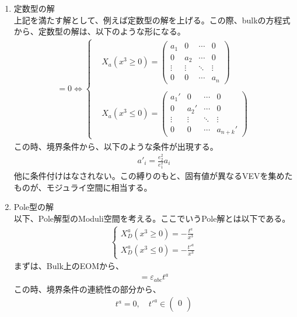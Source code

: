 \documentclass[dvipdfmx,a4paper,10.5pt]{article}
\numberwithin{equation}{section}
\begin{document}
\begin{enumerate}
    \item 定数型の解\\
    上記を満たす解として、例えば定数型の解を上げる。この際、bulkの方程式から、定数型の解は、以下のような形になる。
    \begin{align*}
    [X_{b},X_{c}]=0\iff 
    \begin{cases}
    &X_{a}(x^{3}\geq0)=\begin{pmatrix}
a_1 & 0 & \cdots & 0 \\
0 & a_2 & \cdots & 0 \\
\vdots & \vdots & \ddots & \vdots \\
0 & 0 & \cdots & a_n
\end{pmatrix}\\  
\\
&X_{a}(x^{3}\leq0)=\begin{pmatrix}
a_1' & 0 & \cdots & 0 \\
0 & a_2' & \cdots & 0 \\
\vdots & \vdots & \ddots & \vdots \\
0 & 0 & \cdots & a_{n+k}'
\end{pmatrix}
    \end{cases}
\end{align*}
この時、境界条件から、以下のような条件が出現する。
\begin{align*}
    a'_{i}=\frac{e_{2}^{2}}{e_{1}^{2}}a_{i}
\end{align*}
他に条件付けはなされない。この縛りのもと、固有値が異なるVEVを集めたものが、モジュライ空間に相当する。
    \item Pole型の解\\
    以下、Pole解型のModuli空間を考える。ここでいうPole解とは以下である。
    \begin{align*}
    \begin{cases}
         X_{D}^{a}(x^{3}\geq 0)=-\frac{t^{a}}{x^{3}}\\
         X_{D}^{a}(x^{3}\leq 0)=-\frac{t'^{a}}{x^{3}}
    \end{cases}
    \end{align*}
    まずは、Bulk上のEOMから、
    \begin{align*}
        [t^{b},t^{c}]=\varepsilon_{abc}t^{a}
    \end{align*}
    この時、境界条件の連続性の部分から、
    \begin{align*}
        t^{a}=0,\quad t'^{a}\in \begin{pmatrix}
            0 \\

\end{pmatrix}
\end{align*}
\end{enumerate}
\end{document}
